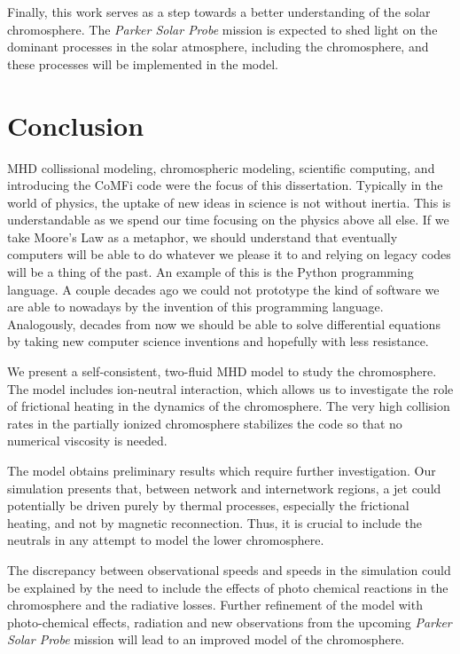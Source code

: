 \documentclass[12pt,upcase]{umlthesis}
\begin{document}
Finally, this work serves as a step towards a better understanding of the solar chromosphere. The {\it Parker Solar Probe\/} mission \citep{SolarProbe16} is expected to shed light on the dominant processes in the solar atmosphere, including the chromosphere, and these processes will be implemented in the model. 

\chapter{Conclusion}\label{chap:conclusion}

MHD collissional modeling, chromospheric modeling, scientific computing, and introducing the CoMFi code were the focus of this dissertation. Typically in the world of physics, the uptake of new ideas in science is not without inertia. This is understandable as we spend our time focusing on the physics above all else. If we take Moore's Law as a metaphor, we should understand that eventually computers will be able to do whatever we please it to and relying on legacy codes will be a thing of the past. An example of this is the Python programming language. A couple decades ago we could not prototype the kind of software we are able to nowadays by the invention of this programming language. Analogously, decades from now we should be able to solve differential equations by taking new computer science inventions and hopefully with less resistance.

We present a self-consistent, two-fluid MHD model to study the chromosphere. The model includes ion-neutral interaction, which allows us to investigate the role of frictional heating in the dynamics of the chromosphere.  The very high collision rates in the partially ionized chromosphere stabilizes the code so that no numerical viscosity is needed.  

The model obtains preliminary results which require further investigation. Our simulation presents that, between network and internetwork regions, a jet could potentially be driven purely by thermal processes, especially the frictional heating, and not by magnetic reconnection. Thus, it is crucial to include the neutrals in any attempt to model the lower chromosphere.

The discrepancy between observational speeds and speeds in the simulation could be explained by the need to include the effects of photo chemical reactions in the chromosphere and the radiative losses. Further refinement of the model with photo-chemical effects, radiation and new observations from the upcoming {\it Parker Solar Probe\/} mission will lead to an improved model of the chromosphere.  
\end{document}
